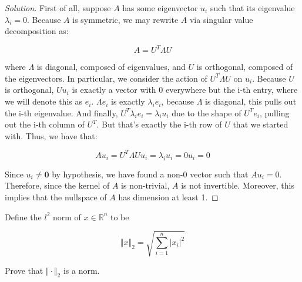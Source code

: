 \documentclass[10pt]{article}
\newenvironment{problem}[2][]{\begin{trivlist}
\item[\hskip \labelsep {\bfseries #1}\hskip \labelsep {\bfseries #2.}]}{\end{trivlist}}
\begin{document}
\begin{proof}[Solution]

First of all, suppose $A$ has some eigenvector $u_i$ such that its eigenvalue $\lambda_i =0$. Because $A$ is symmetric, we may rewrite $A$ via singular value decomposition as:

$$ A = U^T \Lambda U$$

where $\Lambda$ is diagonal, composed of eigenvalues, and $U$ is orthogonal, composed of the eigenvectors. In particular, we consider the action of $U^T \Lambda U$ on $u_i$. Because $U$ is orthogonal, $U u_i$ is exactly a vector with 0 everywhere but the i-th entry, where we will denote this as $e_i$. $\Lambda e_i$ is exactly $\lambda_i e_i$, because $\Lambda$ is diagonal, this pulls out the i-th eigenvalue. And finally, $U^T \lambda_i e_i = \lambda_i u_i$ due to the shape of $U^T e_i$, pulling out the i-th column of $U^T$. But that's exactly the i-th row of $U$ that we started with. Thus, we have that:

$$A u_i = U^T \Lambda U u_i = \lambda_i u_i = 0 u_i = 0$$

Since $u_i \not = \mathbf{0}$ by hypothesis, we have found a non-0 vector such that $Au_i = 0$. Therefore, since the kernel of $A$ is non-trivial, $A$ is not invertible. Moreover, this implies that the nullspace of $A$ has dimension at least 1.

\end{proof}

\begin{problem}{Question 3}

Define the $l^2$ norm of $x \in \mathbb{R}^n$ to be

$$ \Vert x \Vert_2 = \sqrt{ \sum_{i=1}^n | x_i |^2}$$

Prove that $\Vert \cdot \Vert_2$ is a norm.

\end{problem}
\end{document}
